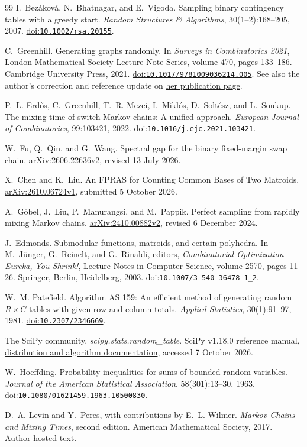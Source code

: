 \documentclass[11pt]{article}
\newcommand{\doi}[1]{\href{https://doi.org/#1}{doi:\nolinkurl{#1}}}
\begin{document}
\begin{thebibliography}{99}
I.~Bez\'akov\'a, N.~Bhatnagar, and E.~Vigoda.
Sampling binary contingency tables with a greedy start.
\emph{Random Structures \& Algorithms}, 30(1--2):168--205, 2007.
\doi{10.1002/rsa.20155}.

C.~Greenhill.
Generating graphs randomly.
In \emph{Surveys in Combinatorics 2021}, London Mathematical Society Lecture Note Series, volume 470, pages 133--186.
Cambridge University Press, 2021.
\doi{10.1017/9781009036214.005}.
See also the author's correction and reference update on
\href{https://web.maths.unsw.edu.au/~csg/publications.html}{her publication page}.

P.~L. Erd\H{o}s, C.~Greenhill, T.~R. Mezei, I.~Mikl\'os, D.~Solt\'esz, and L.~Soukup.
The mixing time of switch Markov chains: A unified approach.
\emph{European Journal of Combinatorics}, 99:103421, 2022.
\doi{10.1016/j.ejc.2021.103421}.

W.~Fu, Q.~Qin, and G.~Wang.
Spectral gap for the binary fixed-margin swap chain.
\href{https://arxiv.org/abs/2606.22636v2}{arXiv:2606.22636v2}, revised 13 July 2026.

X.~Chen and K.~Liu.
An FPRAS for Counting Common Bases of Two Matroids.
\href{https://arxiv.org/abs/2610.06724v1}{arXiv:2610.06724v1}, submitted 5 October 2026.

A.~G\"obel, J.~Liu, P.~Manurangsi, and M.~Pappik.
Perfect sampling from rapidly mixing Markov chains.
\href{https://arxiv.org/abs/2410.00882v2}{arXiv:2410.00882v2}, revised 6 December 2024.

J.~Edmonds.
Submodular functions, matroids, and certain polyhedra.
In M.~J\"unger, G.~Reinelt, and G.~Rinaldi, editors,
\emph{Combinatorial Optimization---Eureka, You Shrink!},
Lecture Notes in Computer Science, volume 2570, pages 11--26.
Springer, Berlin, Heidelberg, 2003.
\doi{10.1007/3-540-36478-1_2}.

W.~M. Patefield.
Algorithm AS 159: An efficient method of generating random \(R\times C\) tables with given row and column totals.
\emph{Applied Statistics}, 30(1):91--97, 1981.
\doi{10.2307/2346669}.

The SciPy community.
\emph{scipy.stats.random\_table}.
SciPy v1.18.0 reference manual,
\href{https://docs.scipy.org/doc/scipy-1.18.0/reference/generated/scipy.stats.random_table.html}{distribution and algorithm documentation},
accessed 7 October 2026.

W.~Hoeffding.
Probability inequalities for sums of bounded random variables.
\emph{Journal of the American Statistical Association}, 58(301):13--30, 1963.
\doi{10.1080/01621459.1963.10500830}.

D.~A. Levin and Y.~Peres, with contributions by E.~L. Wilmer.
\emph{Markov Chains and Mixing Times}, second edition.
American Mathematical Society, 2017.
\href{https://pages.uoregon.edu/dlevin/MARKOV/mcmt2e.pdf}{Author-hosted text}.
\end{thebibliography}
\end{document}
